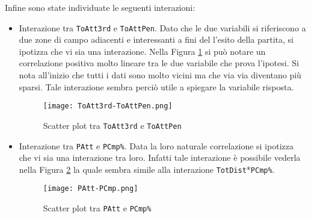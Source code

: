 Infine sono state individuate le seguenti interazioni:
\begin{itemize}
	\item Interazione tra \texttt{ToAtt3rd} e \texttt{ToAttPen}. Dato che le due variabili si riferiscono a due zone di campo adiacenti e interessanti a fini del l'esito della partita, si ipotizza che vi sia una interazione. Nella Figura \ref{fig:toatt} si può notare un correlazione positiva molto lineare tra le due variabile che prova l'ipotesi. Si nota all'inizio che tutti i dati sono molto vicini ma che via via diventano più sparsi. Tale interazione sembra perciò utile a spiegare la variabile risposta.
	\begin{figure}[htbp]
		\begin{center}
			\texttt{[image: ToAtt3rd-ToAttPen.png]}
			\caption{Scatter plot tra \texttt{ToAtt3rd} e \texttt{ToAttPen}}  \label{fig:toatt}
		\end{center}
	\end{figure}
	\item Interazione tra \texttt{PAtt} e \texttt{PCmp\%}. Data la loro naturale correlazione si ipotizza che vi sia una interazione tra loro. Infatti tale interazione è possibile vederla nella Figura \ref{fig:pp} la quale sembra simile alla interazione \texttt{TotDist}*\texttt{PCmp\%}.
	\begin{figure}[htbp]
		\begin{center}
			\texttt{[image: PAtt-PCmp.png]}
			\caption{Scatter plot tra \texttt{PAtt} e \texttt{PCmp\%}}  \label{fig:pp}
		\end{center}
	\end{figure}

\end{itemize}

